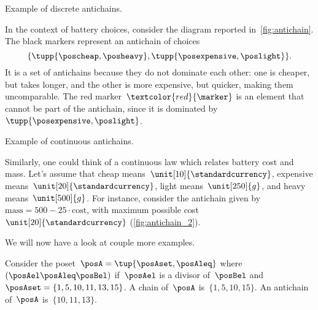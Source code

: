 \begin{marginfigure}
	\centering
	\caption{Example of discrete antichains.}
	\label{fig:antichain}
\end{marginfigure}

In the context of battery choices, consider the diagram reported in~\cref{fig:antichain}.
The black markers represent an antichain of choices
\begin{equation}
	\{
	\tupp{\poscheap,\posheavy},
	\tupp{\posexpensive,\poslight}
	\}.
\end{equation}
It is a set of antichains because they do not dominate each other: one is cheaper, but takes longer, and the other is more expensive, but quicker, making them uncomparable.
The red marker~$\textcolor{red}{\marker}$ is an element that cannot be part of the antichain, since it is dominated by~$\tupp{\posexpensive,\poslight}$.

%
\begin{marginfigure}
	\centering
	\caption{Example of continuous antichains.}
	\label{fig:antichain_2}
\end{marginfigure}

Similarly, one could think of a continuous law which relates battery cost and mass.
Let's assume that cheap means~$\unit[10]{\standardcurrency}$, expensive means~$\unit[20]{\standardcurrency}$, light means~$\unit[250]{g}$, and heavy means~$\unit[500]{g}$.
For instance, consider the antichain given by~$\text{mass}=500-25\cdot \text{cost}$, with maximum possible cost~$\unit[20]{\standardcurrency}$ (\cref{fig:antichain_2}).

We will now have a look at couple more examples.
\begin{example}
	Consider the poset~$\posA=\tup{\posAset,\posAleq}$ where~$(\posAel \posAleq \posBel)$ if~$\posAel$ is a divisor of~$\posBel$ and~$\posAset=\{1,5,10,11,13,15\}$.
	A chain of~$\posA$ is~$\{1,5,10,15\}$.
	An antichain of~$\posA$ is~$\{10,11,13\}$.
\end{example}

